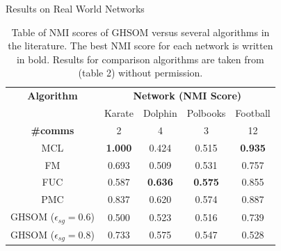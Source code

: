 \documentclass{beamer}
\begin{document}
	\begin{frame}{Results on Real World Networks}
		\begin{table}
			\centering
			\begin{tabular}{ c c c c c }
				\toprule
				\textbf{Algorithm} & \multicolumn{4}{c}{\textbf{Network (NMI Score)}}\\
				{} & Karate & Dolphin & Polbooks & Football \\ 
				\bottomrule
				\textbf{\#comms} & 2 & 4 & 3 & 12 \\
				\bottomrule 
				MCL & \textbf{1.000} & 0.424 & 0.515 & \textbf{0.935} \\ 
				FM & 0.693 & 0.509 & 0.531 & 0.757 \\ 
				FUC & 0.587 & \textbf{0.636} & \textbf{0.575} & 0.855 \\ 
				PMC & 0.837 & 0.620 & 0.574 & 0.887 \\ 
				\toprule
				GHSOM ($\epsilon_{sg}=0.6$) & 0.500 & 0.523 & 0.516 & 0.739 \\
				GHSOM ($\epsilon_{sg}=0.8$) & 0.733 & 0.575 & 0.547 & 0.528 \\
				\bottomrule
			\end{tabular}
			\caption{Table of NMI scores of GHSOM versus several algorithms in the literature. The best NMI score for each network is written in bold. Results for comparison algorithms are taken from \protect\cite{yang2013hierarchical} (table 2) without permission. }
			\label{real_world_experiment}
		\end{table}
	\end{frame}
	
\end{document}
